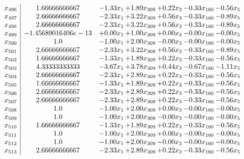 \documentclass[8pt]{article}
\begin{document}
\[\begin{array}{c| c c@{\hskip 2pt} c@{\hskip 2pt} c@{\hskip 2pt} c@{\hskip 2pt} c@{\hskip 2pt} }
 x_{496}   &  1.66666666667 & -1.33 x_{1} & +  1.89 x_{309} & +  0.22 x_{3} & -0.33 x_{160} & -0.56 x_{5}\\
 x_{497}   &  2.66666666667 & -2.33 x_{1} & +  3.22 x_{309} & +  0.56 x_{3} & -0.33 x_{160} & -0.89 x_{5}\\
 x_{498}   &  2.66666666667 & -2.33 x_{1} & +  3.22 x_{309} & +  0.56 x_{3} & -0.33 x_{160} & -0.89 x_{5}\\
 x_{499}   &  -1.45689016406e-13 & +  0.00 x_{1} & +  1.00 x_{309} & +  0.00 x_{3} & -0.00 x_{160} & -0.00 x_{5}\\
 x_{500}   &  1.0 & -1.00 x_{1} & +  2.00 x_{309} & -0.00 x_{3} & -0.00 x_{160} & -0.00 x_{5}\\
 x_{501}   &  2.66666666667 & -2.33 x_{1} & +  3.22 x_{309} & +  0.56 x_{3} & -0.33 x_{160} & -0.89 x_{5}\\
 x_{502}   &  1.66666666667 & -1.33 x_{1} & +  1.89 x_{309} & +  0.22 x_{3} & -0.33 x_{160} & -0.56 x_{5}\\
 x_{503}   &  4.33333333333 & -3.67 x_{1} & +  3.78 x_{309} & +  0.44 x_{3} & -0.67 x_{160} & -1.11 x_{5}\\
 x_{504}   &  2.66666666667 & -2.33 x_{1} & +  2.89 x_{309} & +  0.22 x_{3} & -0.33 x_{160} & -0.56 x_{5}\\
 x_{505}   &  1.66666666667 & -1.33 x_{1} & +  1.89 x_{309} & +  0.22 x_{3} & -0.33 x_{160} & -0.56 x_{5}\\
 x_{506}   &  2.66666666667 & -2.33 x_{1} & +  2.89 x_{309} & +  0.22 x_{3} & -0.33 x_{160} & -0.56 x_{5}\\
 x_{507}   &  2.66666666667 & -2.33 x_{1} & +  2.89 x_{309} & +  0.22 x_{3} & -0.33 x_{160} & -0.56 x_{5}\\
 x_{508}   &  1.0 & -1.00 x_{1} & +  2.00 x_{309} & +  0.00 x_{3} & -0.00 x_{160} & -0.00 x_{5}\\
 x_{509}   &  1.0 & -1.00 x_{1} & +  2.00 x_{309} & -0.00 x_{3} & -0.00 x_{160} & -0.00 x_{5}\\
 x_{510}   &  1.66666666667 & -1.33 x_{1} & +  1.89 x_{309} & +  0.22 x_{3} & -0.33 x_{160} & -0.56 x_{5}\\
 x_{511}   &  1.0 & -1.00 x_{1} & +  2.00 x_{309} & +  0.00 x_{3} & -0.00 x_{160} & -0.00 x_{5}\\
 x_{512}   &  1.0 & -1.00 x_{1} & +  2.00 x_{309} & -0.00 x_{3} & -0.00 x_{160} & -0.00 x_{5}\\
 x_{513}   &  2.66666666667 & -2.33 x_{1} & +  2.89 x_{309} & +  0.22 x_{3} & -0.33 x_{160} & -0.56 x_{5}\\

\end{array}\]
\end{document}
